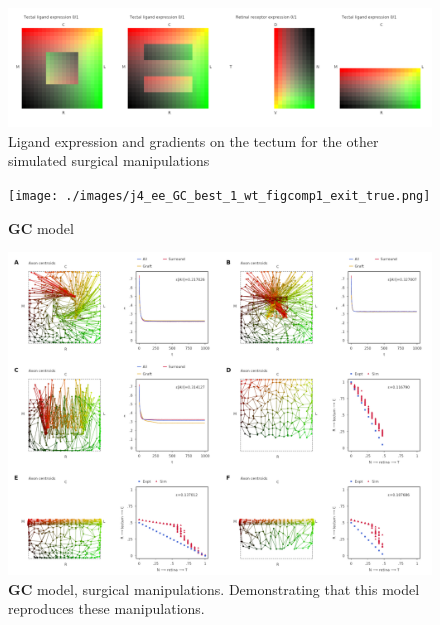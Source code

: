 \documentclass[11pt, a4paper]{article}
\begin{document}
\begin{figure}
\includegraphics[width=\linewidth]{./images/expressions_manipulations.png}
\caption{Ligand expression and gradients on the tectum for the
other simulated surgical manipulations}
\label{f:tmanip}
\end{figure}

\begin{figure}
\texttt{[image: ./images/j4\_ee\_GC\_best\_1\_wt\_figcomp1\_exit\_true.png]}
\caption{$\mathbf{GC}$ model}
\label{f:GC}
\end{figure}

\begin{figure}
\includegraphics[width=\linewidth]{./images/fig_GC_surgical.png}
\caption{$\mathbf{GC}$ model, surgical manipulations. Demonstrating that this
model reproduces these manipulations.}
\label{f:GCsurg}
\end{figure}


\end{document}
